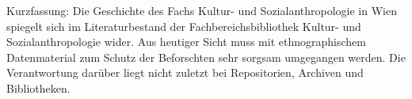 Kurzfassung: Die Geschichte des Fachs Kultur- und Sozialanthropologie in
Wien spiegelt sich im Literaturbestand der Fachbereichsbibliothek
Kultur- und Sozialanthropologie wider. Aus heutiger Sicht muss mit
ethnographischem Datenmaterial zum Schutz der Beforschten sehr sorgsam
umgegangen werden. Die Verantwortung darüber liegt nicht zuletzt bei
Repositorien, Archiven und Bibliotheken.
